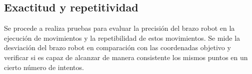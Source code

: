\subsection{Exactitud y repetitividad} 
Se procede a realiza pruebas para evaluar la precisión del brazo robot en la ejecución de movimientos y la repetibilidad 
de estos movimientos. Se mide la desviación del brazo robot en comparación con las coordenadas objetivo y verificar si 
es capaz de alcanzar de manera consistente los mismos puntos en un cierto número de intentos.


